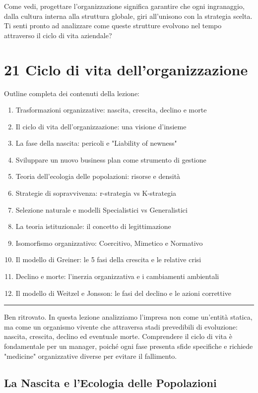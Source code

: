 \documentclass[a4paper,10pt]{article}
\begin{document}
Come vedi, progettare l'organizzazione significa garantire che ogni ingranaggio, dalla cultura interna alla struttura globale, giri all'unisono con la strategia scelta. Ti senti pronto ad analizzare come queste strutture evolvono nel tempo attraverso il ciclo di vita aziendale?
\section*{21 Ciclo di vita dell'organizzazione}

Outline completa dei contenuti della lezione:
{\small
\begin{enumerate}
\item Trasformazioni organizzative: nascita, crescita, declino e morte
\item Il ciclo di vita dell’organizzazione: una visione d'insieme
\item La fase della nascita: pericoli e "Liability of newness"
\item Sviluppare un nuovo business plan come strumento di gestione
\item Teoria dell’ecologia delle popolazioni: risorse e densità
\item Strategie di sopravvivenza: r-strategia vs K-strategia
\item Selezione naturale e modelli Specialistici vs Generalistici
\item La teoria istituzionale: il concetto di legittimazione
\item Isomorfismo organizzativo: Coercitivo, Mimetico e Normativo
\item Il modello di Greiner: le 5 fasi della crescita e le relative crisi
\item Declino e morte: l'inerzia organizzativa e i cambiamenti ambientali
\item Il modello di Weitzel e Jonsson: le fasi del declino e le azioni correttive
\end{enumerate}
}
\hrule
\vspace{0.5cm}

Ben ritrovato. In questa lezione analizziamo l'impresa non come un'entità statica, ma come un organismo vivente che attraversa stadi prevedibili di evoluzione: nascita, crescita, declino ed eventuale morte. Comprendere il ciclo di vita è fondamentale per un manager, poiché ogni fase presenta sfide specifiche e richiede "medicine" organizzative diverse per evitare il fallimento.

\subsection*{La Nascita e l'Ecologia delle Popolazioni}
\end{document}
